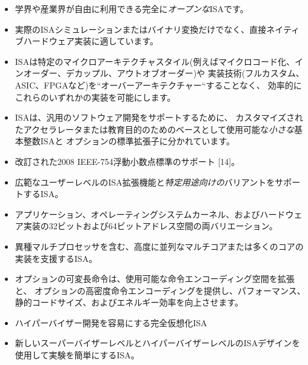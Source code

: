 \vspace{-0.1in}
\begin{itemize}
\parskip 0pt
\itemsep 1pt
\item 学界や産業界が自由に利用できる完全に{\em オープンな}ISAです。
\item 実際のISAシミュレーションまたはバイナリ変換だけでなく、直接ネイティブハードウェア実装に適しています。
\item ISAは特定のマイクロアーキテクチャスタイル(例えばマイクロコード化、インオーダー、デカップル、アウトオブオーダー)や
  実装技術(フルカスタム、ASIC、FPGAなど)を``オーバーアーキテクチャー``することなく、
  効率的にこれらのいずれかの実装を可能にします。
\item ISAは、汎用のソフトウェア開発をサポートするために、
  カスタマイズされたアクセラレータまたは教育目的のためのベースとして使用可能な{\em 小さな}基本整数ISAと
  オプションの標準拡張子に分かれています。
\item 改訂された2008 IEEE-754浮動小数点標準のサポート [14]。
\item 広範なユーザーレベルのISA拡張機能と{\em 特定用途向けの}バリアントをサポートするISA。
\item アプリケーション、オペレーティングシステムカーネル、およびハードウェア実装の32ビットおよび64ビットアドレス空間の両バリエーション。
\item 異種マルチプロセッサを含む、高度に並列なマルチコアまたは多くのコアの実装を支援するISA。
\item オプションの可変長命令は、使用可能な命令エンコーディング空間を拡張と、
  オプションの高密度命令エンコーディングを提供し、パフォーマンス、
  静的コードサイズ、およびエネルギー効率を向上させます。
\item ハイパーバイザー開発を容易にする完全仮想化ISA
\item 新しいスーパーバイザーレベルとハイパーバイザーレベルのISAデザインを使用して実験を簡単にするISA。
\end{itemize}
\vspace{-0.1in}

